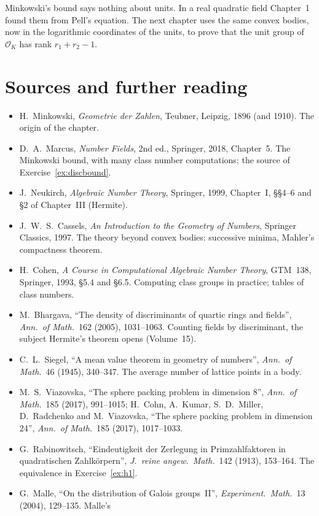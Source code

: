 Minkowski's bound says nothing about units. In a real quadratic field Chapter~1 found them from Pell's equation. The next
chapter uses the same convex bodies, now in the logarithmic coordinates of the units, to prove that the unit group of
$\mathcal O_K$ has rank $r_1+r_2-1$.

\section*{Sources and further reading}

\begin{itemize}
\item H.~Minkowski, \emph{Geometrie der Zahlen}, Teubner, Leipzig, 1896 (and 1910). The origin of the chapter.
\item D.~A.~Marcus, \emph{Number Fields}, 2nd ed., Springer, 2018, Chapter~5. The Minkowski bound, with many class
number computations; the source of Exercise~\ref{ex:discbound}.
\item J.~Neukirch, \emph{Algebraic Number Theory}, Springer, 1999, Chapter~I, \S\S4--6 and \S2 of Chapter~III (Hermite).
\item J.~W.~S.~Cassels, \emph{An Introduction to the Geometry of Numbers}, Springer Classics, 1997. The theory beyond
convex bodies: successive minima, Mahler's compactness theorem.
\item H.~Cohen, \emph{A Course in Computational Algebraic Number Theory}, GTM~138, Springer, 1993, \S5.4 and \S6.5.
Computing class groups in practice; tables of class numbers.
\item M.~Bhargava, ``The density of discriminants of quartic rings and fields'', \emph{Ann.\ of Math.}\ 162 (2005),
1031--1063. Counting fields by discriminant, the subject Hermite's theorem opens (Volume~15).
\item C.~L.~Siegel, ``A mean value theorem in geometry of numbers'', \emph{Ann.\ of Math.}\ 46 (1945), 340--347. The average
number of lattice points in a body.
\item M.~S.~Viazovska, ``The sphere packing problem in dimension 8'', \emph{Ann.\ of Math.}\ 185 (2017), 991--1015; H.~Cohn,
A.~Kumar, S.~D.~Miller, D.~Radchenko and M.~Viazovska, ``The sphere packing problem in dimension 24'', \emph{Ann.\ of
Math.}\ 185 (2017), 1017--1033.
\item G.~Rabinowitsch, ``Eindeutigkeit der Zerlegung in Primzahlfaktoren in quadratischen Zahlk\"orpern'', \emph{J.\ reine
angew.\ Math.}\ 142 (1913), 153--164. The equivalence in Exercise~\ref{ex:h1}.
\item G.~Malle, ``On the distribution of Galois groups~II'', \emph{Experiment.\ Math.}\ 13 (2004), 129--135. Malle's

\end{itemize}
